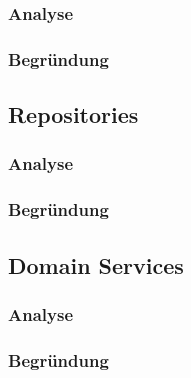 		\subsubsection{Analyse}

		\subsubsection{Begründung}

	\subsection{Repositories}

		\subsubsection{Analyse}

		\subsubsection{Begründung}

	\subsection{Domain Services}

		\subsubsection{Analyse}

		\subsubsection{Begründung}